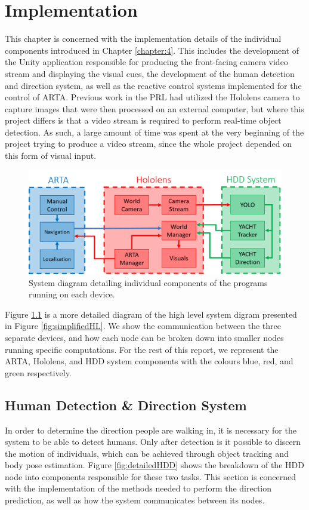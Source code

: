 \chapter{Implementation}
This chapter is concerned with the implementation details of the individual components introduced in Chapter \ref{chapter:4}. This includes the development of the Unity application responsible for producing the front-facing camera video stream and displaying the visual cues, the development of the human detection and direction system, as well as the reactive control systems implemented for the control of ARTA. Previous work in the PRL had utilized the Hololens camera to capture images that were then processed on an external computer, but where this project differs is that a video stream is required to perform real-time object detection. As such, a large amount of time was spent at the very beginning of the project trying to produce a video stream, since the whole project depended on this form of visual input.

\begin{figure}[ht]
    \centering
    \includegraphics[width=1.0\linewidth]{img/chapter5_implementation/detailedSystemDiagram.png}
    \caption{System diagram detailing individual components of the programs running on each device.}
    \label{fig:detailedHL}
\end{figure}

Figure \ref{fig:detailedHL} is a more detailed diagram of the high level system digram presented in Figure \ref{fig:simplifiedHL}. We show the communication between the three separate devices, and how each node can be broken down into smaller nodes running specific computations. For the rest of this report, we represent the ARTA, Hololens, and HDD system components with the colours blue, red, and green respectively.

\section{Human Detection \& Direction System}
In order to determine the direction people are walking in, it is necessary for the system to be able to detect humans. Only after detection is it possible to discern the motion of individuals, which can be achieved through object tracking and body pose estimation. Figure \ref{fig:detailedHDD} shows the breakdown of the HDD node into components responsible for these two tasks. This section is concerned with the implementation of the methods needed to perform the direction prediction, as well as how the system communicates between its nodes. 

